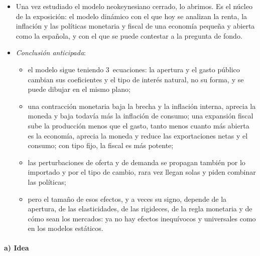 \documentclass[11pt]{article}
\begin{document}
\begin{itemize}
\item Una vez estudiado el modelo neokeynesiano cerrado, lo abrimos. Es el núcleo de la exposición: el modelo dinámico con el que hoy se analizan la renta, la inflación y las políticas monetaria y fiscal de una economía pequeña y abierta como la española, y con el que se puede contestar a la pregunta de fondo.
\item \emph{Conclusión anticipada}:
  \begin{itemize}
  \item el modelo sigue teniendo 3~ecuaciones: la apertura y el gasto público cambian sus coeficientes y el tipo de interés natural, no su forma, y se puede dibujar en el mismo plano;
  \item una contracción monetaria baja la brecha y la inflación interna, aprecia la moneda y baja todavía más la inflación de consumo; una expansión fiscal sube la producción menos que el gasto, tanto menos cuanto más abierta es la economía, aprecia la moneda y reduce las exportaciones netas y el consumo; con tipo fijo, la fiscal es más potente;
  \item las perturbaciones de oferta y de demanda se propagan también por lo importado y por el tipo de cambio, rara vez llegan solas y piden combinar las políticas;
  \item pero el tamaño de esos efectos, y a veces su signo, depende de la apertura, de las elasticidades, de las rigideces, de la regla monetaria y de cómo sean los mercados: ya no hay efectos inequívocos y universales como en los modelos estáticos.
  \end{itemize}
\end{itemize}

\paragraph{a) Idea}
\end{document}
